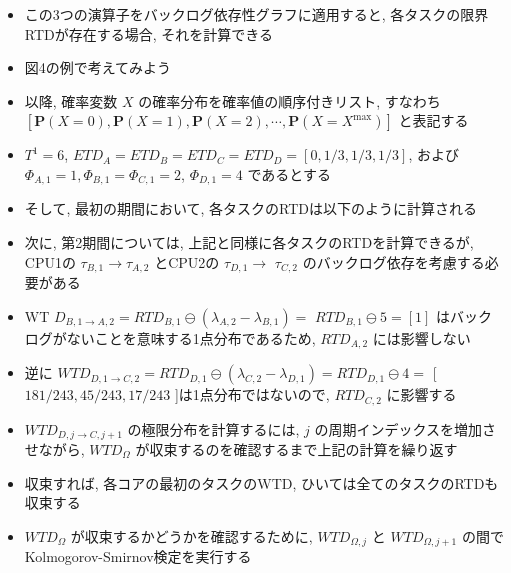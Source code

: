 \begin{frame}{}
    \begin{itemize}
        \item この3つの演算子をバックログ依存性グラフに適用すると, 各タスクの限界RTDが存在する場合, それを計算できる
\item 図4の例で考えてみよう
\item 以降, 確率変数 $X$ の確率分布を確率値の順序付きリスト, すなわち $[\mathbf{P}(X=0), \mathbf{P}(X=1), \mathbf{P}(X=2), \cdots, \mathbf{P}\left(X=X^{\max }\right)]$ と表記する
\item $T^{1}=6$, $E T D_{A}=E T D_{B}=E T D_{C}=E T D_{D}=[0,1 / 3,1 / 3,1 / 3]$, および $\Phi_{A, 1}=1, \Phi_{B, 1}=\Phi_{C, 1}=2$, $\Phi_{D, 1}=4$ であるとする
\item そして, 最初の期間において, 各タスクのRTDは以下のように計算される
    \end{itemize}
\end{frame}

\begin{frame}{}
    \begin{itemize}
        \item 次に, 第2期間については, 上記と同様に各タスクのRTDを計算できるが, CPU1の $\tau_{B, 1} \rightarrow \tau_{A, 2}$ とCPU2の $\tau_{D, 1} \rightarrow$  $\tau_{C, 2}$ のバックログ依存を考慮する必要がある
\item WT $D_{B, 1 \rightarrow A, 2}=R T D_{B, 1} \ominus\left(\lambda_{A, 2}-\lambda_{B, 1}\right)=$  $R T D_{B, 1} \ominus 5=[1]$ はバックログがないことを意味する1点分布であるため, $R T D_{A, 2}$ には影響しない
\item 逆に $W T D_{D, 1 \rightarrow C, 2}=R T D_{D, 1} \ominus\left(\lambda_{C, 2}-\lambda_{D, 1}\right)=R T D_{D, 1} \ominus 4=$ [ $181 / 243,45 / 243,17 / 243$ ]は1点分布ではないので, $R T D_{C, 2}$ に影響する
    \end{itemize}
\end{frame}

\begin{frame}{}
    \begin{itemize}
        \item $W T D_{D, j \rightarrow C, j+1}$ の極限分布を計算するには, $j$ の周期インデックスを増加させながら, $W T D_{\Omega}$ が収束するのを確認するまで上記の計算を繰り返す
\item 収束すれば, 各コアの最初のタスクのWTD, ひいては全てのタスクのRTDも収束する
\item $W T D_{\Omega}$ が収束するかどうかを確認するために, $W T D_{\Omega, j}$ と $W T D_{\Omega, j+1}$ の間でKolmogorov-Smirnov検定を実行する
    \end{itemize}
\end{frame}

